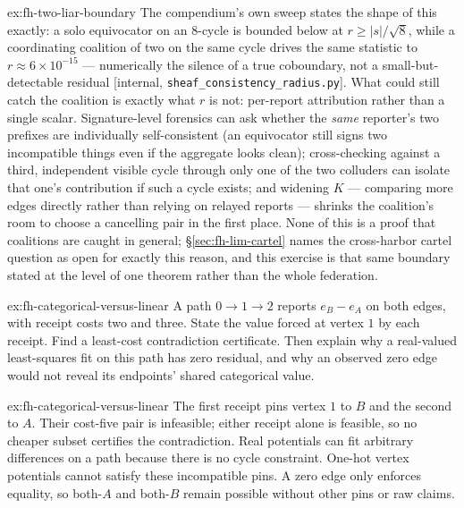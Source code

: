 \documentclass[11pt,a4paper]{article}
\theoremstyle{definition}
\theoremstyle{remark}
\begin{document}
\begin{pdsolution}{ex:fh-two-liar-boundary}
The compendium's own sweep states the shape of this exactly: a solo equivocator on an 8-cycle is bounded below at $r\ge|s|/\sqrt8$, while a coordinating coalition of two on the same cycle drives the same statistic to $r\approx6\times10^{-15}$ --- numerically the silence of a true coboundary, not a small-but-detectable residual [internal, \texttt{sheaf\_consistency\_radius.py}]. What could still catch the coalition is exactly what $r$ is not: per-report attribution rather than a single scalar. Signature-level forensics can ask whether the \emph{same} reporter's two prefixes are individually self-consistent (an equivocator still signs two incompatible things even if the aggregate looks clean); cross-checking against a third, independent visible cycle through only one of the two colluders can isolate that one's contribution if such a cycle exists; and widening $K$ --- comparing more edges directly rather than relying on relayed reports --- shrinks the coalition's room to choose a cancelling pair in the first place. None of this is a proof that coalitions are caught in general; \S\ref{sec:fh-lim-cartel} names the cross-harbor cartel question as open for exactly this reason, and this exercise is that same boundary stated at the level of one theorem rather than the whole federation.
\end{pdsolution}

\begin{pdexercise}[kind=Trace,rating=2]{ex:fh-categorical-versus-linear}
A path $0\to1\to2$ reports $e_B-e_A$ on both edges, with receipt costs two
and three. State the value forced at vertex $1$ by each receipt. Find a
least-cost contradiction certificate. Then explain why a real-valued
least-squares fit on this path has zero residual, and why an observed zero
edge would not reveal its endpoints' shared categorical value.
\end{pdexercise}
\begin{pdsolution}{ex:fh-categorical-versus-linear}
The first receipt pins vertex $1$ to $B$ and the second to $A$. Their cost-five
pair is infeasible; either receipt alone is feasible, so no cheaper subset
certifies the contradiction. Real potentials can fit arbitrary differences
on a path because there is no cycle constraint. One-hot vertex potentials
cannot satisfy these incompatible pins. A zero edge only enforces equality,
so both-$A$ and both-$B$ remain possible without other pins or raw claims.
\end{pdsolution}

\end{document}
